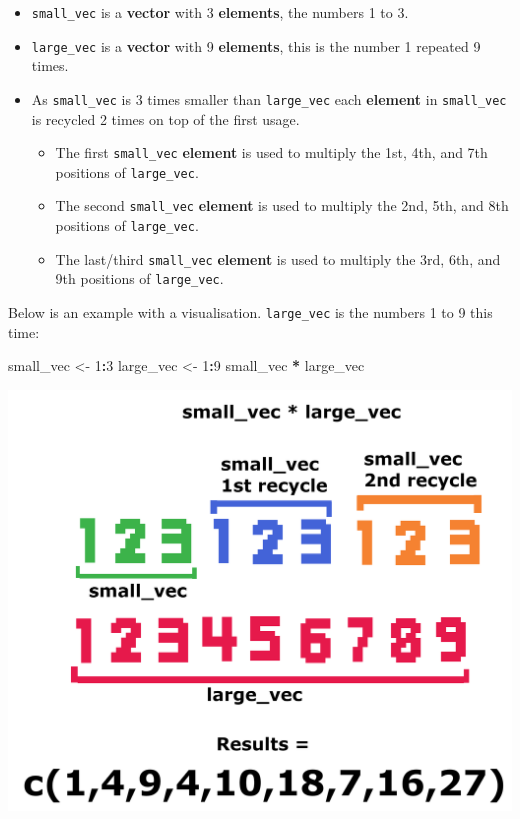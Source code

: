 \documentclass[]{book}
\newenvironment{Shaded}{\begin{snugshade}}{\end{snugshade}}
\newcommand{\DecValTok}[1]{\textcolor[rgb]{0.00,0.00,0.81}{#1}}
\newcommand{\StringTok}[1]{\textcolor[rgb]{0.31,0.60,0.02}{#1}}
\newcommand{\OperatorTok}[1]{\textcolor[rgb]{0.81,0.36,0.00}{\textbf{#1}}}
\newcommand{\NormalTok}[1]{#1}
\providecommand{\tightlist}{%
  \setlength{\itemsep}{0pt}\setlength{\parskip}{0pt}}
\begin{document}
\begin{itemize}
\tightlist
\item
  \texttt{small\_vec} is a \textbf{vector} with 3 \textbf{elements}, the
  numbers 1 to 3.
\item
  \texttt{large\_vec} is a \textbf{vector} with 9 \textbf{elements},
  this is the number 1 repeated 9 times.
\item
  As \texttt{small\_vec} is 3 times smaller than \texttt{large\_vec}
  each \textbf{element} in \texttt{small\_vec} is recycled 2 times on
  top of the first usage.

  \begin{itemize}
  \tightlist
  \item
    The first \texttt{small\_vec} \textbf{element} is used to multiply
    the 1st, 4th, and 7th positions of \texttt{large\_vec}.
  \item
    The second \texttt{small\_vec} \textbf{element} is used to multiply
    the 2nd, 5th, and 8th positions of \texttt{large\_vec}.
  \item
    The last/third \texttt{small\_vec} \textbf{element} is used to
    multiply the 3rd, 6th, and 9th positions of \texttt{large\_vec}.
  \end{itemize}
\end{itemize}

Below is an example with a visualisation. \texttt{large\_vec} is the
numbers 1 to 9 this time:

\begin{Shaded}
\begin{Highlighting}[]
\NormalTok{small_vec <-}\StringTok{ }\DecValTok{1}\OperatorTok{:}\DecValTok{3}
\NormalTok{large_vec <-}\StringTok{ }\DecValTok{1}\OperatorTok{:}\DecValTok{9} 
\NormalTok{small_vec }\OperatorTok{*}\StringTok{ }\NormalTok{large_vec}
\end{Highlighting}
\end{Shaded}

\begin{center}\includegraphics[width=0.8\linewidth]{figures/recycle_rule_example_1} \end{center}
\end{document}
